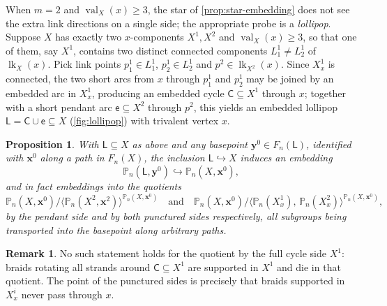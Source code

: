 \documentclass[reqno]{amsart}
\newtheorem{proposition}[theorem]{Proposition}
\theoremstyle{definition}
\newtheorem{remark}[theorem]{Remark}
\newcommand\bfx{\mathbf{x}}
\newcommand\bfy{\mathbf{y}}
\newcommand{\PB}{\mathbb{P}}
\newcommand{\co}[1]{\mathopen{\langle}#1\mathclose{\rangle}} %
\newcommand{\base}{\bfx^0}
\newcommand{\Lollipop}{\mathsf{L}}
\DeclareMathOperator{\lk}{lk}
\DeclareMathOperator{\val}{val}
\numberwithin{equation}{section}
\begin{document}
When \(m=2\) and \(\val_X(x)\geq3\), the star of
\cref{prop:star-embedding} does not see the extra link directions
on a single side; the appropriate probe is a \emph{lollipop}.
Suppose \(X\) has exactly two \(x\)-components \(X^1,X^2\) and
\(\val_X(x)\geq3\), so that one of them, say \(X^1\), contains two
distinct connected components \(L^1_1\neq L^1_2\) of \(\lk_X(x)\).
Pick link points \(p^1_1\in L^1_1\), \(p^1_2\in L^1_2\) and
\(p^2\in\lk_{X^2}(x)\). Since \(X^1_x\) is connected, the two short
arcs from \(x\) through \(p^1_1\) and \(p^1_2\) may be joined by an
embedded arc in \(X^1_x\), producing an embedded cycle
\(\mathsf{C}\subseteq X^1\) through \(x\); together with a short
pendant arc \(\mathsf{e}\subseteq X^2\) through \(p^2\), this
yields an embedded lollipop
\(\Lollipop=\mathsf{C}\cup\mathsf{e}\subseteq X\)
(\cref{fig:lollipop}) with trivalent vertex \(x\).

\begin{proposition}\label{prop:lollipop-embedding}
With \(\Lollipop\subseteq X\) as above and any basepoint
\(\bfy^0\in F_n(\Lollipop)\), identified with \(\base\) along a
path in \(F_n(X)\), the inclusion \(\Lollipop\hookrightarrow X\)
induces an embedding
\[
\PB_n(\Lollipop,\bfy^0)\hookrightarrow\PB_n(X,\base),
\]
and in fact embeddings into the quotients
\[
\PB_n(X,\base)\big/\co{\PB_n(X^2,\bfx^2)}^{\PB_n(X,\base)}
\quad\text{and}\quad
\PB_n(X,\base)\big/
\co{\PB_n(X^1_x),\,\PB_n(X^2_x)}^{\PB_n(X,\base)},
\]
by the pendant side and by both \emph{punctured} sides
respectively, all subgroups being transported into the basepoint
along arbitrary paths.
\end{proposition}
\begin{remark}
No such statement holds for the quotient
by the full cycle side \(X^1\): braids rotating all strands
around \(\mathsf{C}\subseteq X^1\) are supported in \(X^1\) and
die in that quotient. The point of the punctured sides is
precisely that braids supported in \(X^i_x\) never pass through
\(x\).
\end{remark}
\end{document}
